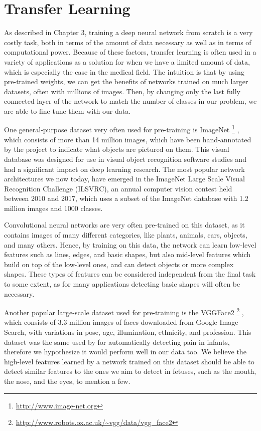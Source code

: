 \section{Transfer Learning}

As described in Chapter 3, training a deep neural network from scratch is a very costly task, both in terms of the amount of data necessary as well as in terms of computational power. Because of these factors, transfer learning is often used in a variety of applications as a solution for when we have a limited amount of data, which is especially the case in the medical field. The intuition is that by using pre-trained weights, we can get the benefits of networks trained on much larger datasets, often with millions of images. Then, by changing only the last fully connected layer of the network to match the number of classes in our problem, we are able to fine-tune them with our data.

One general-purpose dataset very often used for pre-training is ImageNet \footnote{\url{http://www.image-net.org}} \citep{DengDSLL009}, which consists of more than 14 million images, which have been hand-annotated by the project to indicate what objects are pictured on them. This visual database was designed for use in visual object recognition software studies and had a significant impact on deep learning research. The most popular network architectures we now today, have emerged in the ImageNet Large Scale Visual Recognition Challenge (ILSVRC), an annual computer vision contest held between 2010 and 2017, which uses a subset of the ImageNet database with 1.2 million images and 1000 classes. 

Convolutional neural networks are very often pre-trained on this dataset, as it contains images of many different categories, like plants, animals, cars, objects, and many others. Hence, by training on this data, the network can learn low-level features such as lines, edges, and basic shapes, but also mid-level features which build on top of the low-level ones, and can detect objects or more complex shapes. These types of features can be considered independent from the final task to some extent, as for many applications detecting basic shapes will often be necessary.

Another popular large-scale dataset used for pre-training is the VGGFace2 \footnote{\url{http://www.robots.ox.ac.uk/~vgg/data/vgg_face2}} \citep{Cao2018}, which consists of 3.3 million images of faces downloaded from Google Image Search, with variations in pose, age, illumination, ethnicity, and profession. This dataset was the same used by \cite{abs-1807-01631} for automatically detecting pain in infants, therefore we hypothesize it would perform well in our data too. We believe the high-level features learned by a network trained on this dataset should be able to detect similar features to the ones we aim to detect in fetuses, such as the mouth, the nose, and the eyes, to mention a few.

